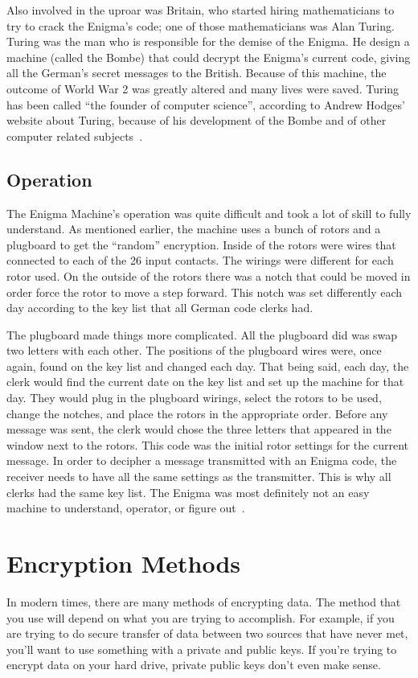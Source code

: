 \documentclass[12pt,a4paper,titlepage]{article}
\begin{document}
Also involved in the uproar was Britain, who started hiring mathematicians to
try to crack the Enigma's code; one of those mathematicians was Alan Turing.
Turing was the man who is responsible for the demise of the Enigma. He design a
machine (called the Bombe) that could decrypt the Enigma's current code, giving
all the German's secret messages to the British. Because of this machine, the
outcome of World War 2 was greatly altered and many lives were saved. Turing has
been called ``the founder of computer science'', according to Andrew Hodges'
website about Turing, because of his development of the Bombe and of other
computer related subjects~\cite{wilcox2006solving}.

\subsection{Operation}
The Enigma Machine's operation was quite difficult and took a lot of skill to
fully understand. As mentioned earlier, the machine uses a bunch of rotors and a
plugboard to get the ``random'' encryption. Inside of the rotors were wires that
connected to each of the 26 input contacts. The wirings were different for each
rotor used. On the outside of the rotors there was a notch that could be moved
in order force the rotor to move a step forward. This notch was set differently
each day according to the key list that all German code clerks had.

The plugboard made things more complicated. All the plugboard did was swap two
letters with each other. The positions of the plugboard wires were, once again,
found on the key list and changed each day. That being said, each day, the
clerk would find the current date on the key list and set up the machine for
that day. They would plug in the plugboard wirings, select the rotors to be
used, change the notches, and place the rotors in the appropriate order. Before
any message was sent, the clerk would chose the three letters that appeared
in the window next to the rotors. This code was the initial rotor settings for
the current message. In order to decipher a message transmitted with an Enigma
code, the receiver needs to have all the same settings as the transmitter. This
is why all clerks had the same key list. The Enigma was most definitely not an
easy machine to understand, operator, or figure out~\cite{wilcox2006solving}.

\section{Encryption Methods}
In modern times, there are many methods of encrypting data. The method that you
use will depend on what you are trying to accomplish. For example, if you are 
trying to do secure transfer of data between two sources that have never met, 
you'll want to use something with a private and public keys. If you're trying 
to encrypt data on your hard drive, private public keys don't even make sense. 
\end{document}
